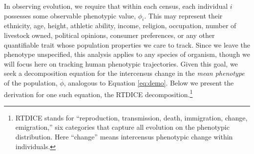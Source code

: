 In observing evolution, we require that within each census, each individual $i$ possesses some observable phenotypic value, $\phi_i$.  This may represent their ethnicity, age, height, athletic ability, income, religion, occupation, number of livestock owned, political opinions, consumer preferences, or any other quantifiable trait whose population properties we care to track.  Since we leave the phenotype unspecified, this analysis applies to any species of organism, though we will focus here on tracking human phenotypic trajectories.  Given this goal, we seek a decomposition equation for the intercensus change in the \textit{mean phenotype} of the population, $\overline{\phi}$, analogous to Equation \ref{eq:demo}.  Below we present the derivation for one such equation, the RTDICE decomposition.\footnote{RTDICE stands for ``reproduction, transmission, death, immigration, change, emigration,'' six categories that capture all evolution on the phenotypic distribution.  Here ``change'' means intercensus phenotypic change within individuals.}

